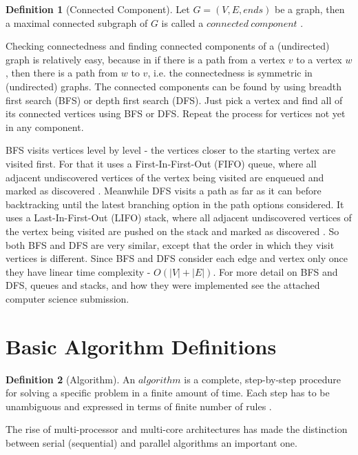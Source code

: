\documentclass{report}
\theoremstyle{plain}
\theoremstyle{definition}
\newtheorem{definition}{Definition}
\theoremstyle{remark}
\numberwithin{definition}{chapter}
\numberwithin{example}{chapter}
\numberwithin{figure}{chapter}
\numberwithin{theorem}{chapter}
\numberwithin{lemma}{chapter}
\begin{document}
\begin{definition}[Connected Component]
Let $G = (V, E, ends)$ be a graph, then a maximal connected subgraph of $G$ is called a $connected \ component$ \cite{bollobas1998modern}.
\end{definition}

Checking connectedness and finding connected components of a (undirected) graph is relatively easy, because in if there is a path from a vertex $v$ to a vertex $w$, then there is a path from $w$ to $v$, i.e. the connectedness is symmetric in (undirected) graphs.
The connected components can be found by using breadth first search (BFS) or depth first search (DFS). Just pick a vertex and find all of its connected vertices using BFS or DFS. Repeat the process for vertices not yet in any component.

BFS visits vertices level by level - the vertices closer to the starting vertex are visited first. For that it uses a First-In-First-Out (FIFO) queue, where all adjacent undiscovered vertices of the vertex being visited are enqueued and marked as discovered \cite{c++_sedgewick}. Meanwhile DFS visits a path as far as it can before backtracking until the latest branching option in the path options considered. It uses a Last-In-First-Out (LIFO) stack, where all adjacent undiscovered vertices of the vertex being visited are pushed on the stack and marked as discovered \cite{c++_sedgewick}. So both BFS and DFS are very similar, except that the order in which they visit vertices is different. Since BFS and DFS consider each edge and vertex only once they have linear time complexity - $O(|V| + |E|)$. For more detail on BFS and DFS, queues and stacks, and how they were implemented see the attached computer science submission.

\section{Basic Algorithm Definitions}

\begin{definition}[Algorithm]
An $algorithm$ is a complete, step-by-step procedure for solving a specific problem in a finite amount of time. Each step has to be unambiguous and expressed in terms of finite number of rules \cite{berman1996fundamentals}.
\end{definition}

The rise of multi-processor and multi-core architectures has made the distinction between serial (sequential) and parallel algorithms an important one.
\end{document}

